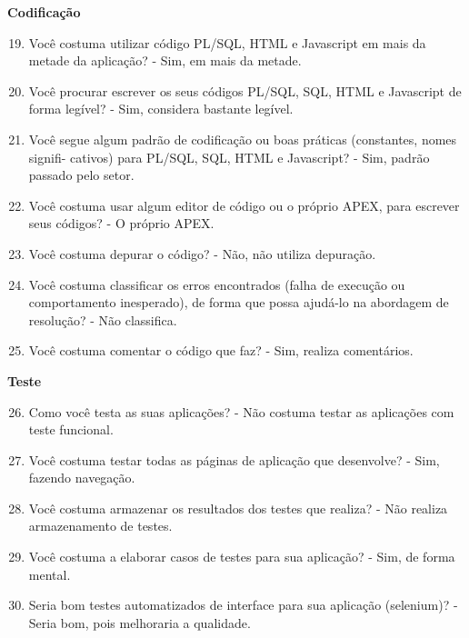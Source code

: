 \begin{anexosenv}
\textbf{Codificação}

\begin{enumerate}
\setcounter{enumi}{18}
\item Você costuma utilizar código PL/SQL, HTML e Javascript em mais da metade da
aplicação?\newline
- Sim, em mais da metade.
\item Você procurar escrever os seus códigos PL/SQL, SQL, HTML e Javascript de forma
legível?\newline
- Sim, considera bastante legível.
\item Você segue algum padrão de codificação ou boas práticas (constantes, nomes signifi-
cativos) para PL/SQL, SQL, HTML e Javascript?\newline
- Sim, padrão passado pelo setor.
\item Você costuma usar algum editor de código ou o próprio APEX, para escrever seus
códigos?\newline
- O próprio APEX.
\item Você costuma depurar o código?\newline
- Não, não utiliza depuração.
\item Você costuma classificar os erros encontrados (falha de execução ou comportamento
inesperado), de forma que possa ajudá-lo na abordagem de resolução?\newline
- Não classifica.
\item Você costuma comentar o código que faz?\newline
- Sim, realiza comentários.
\end{enumerate}

\textbf{Teste}

\begin{enumerate}
\setcounter{enumi}{25}
\item Como você testa as suas aplicações?\newline
- Não costuma testar as aplicações com teste funcional.
\item Você costuma testar todas as páginas de aplicação que desenvolve?\newline
- Sim, fazendo navegação.
\item Você costuma armazenar os resultados dos testes que realiza?\newline
- Não realiza armazenamento de testes.
\item Você costuma a elaborar casos de testes para sua aplicação?\newline
- Sim, de forma mental.
\item Seria bom testes automatizados de interface para sua aplicação (selenium)?\newline
- Seria bom, pois melhoraria a qualidade.
\end{enumerate}


\end{anexosenv}

